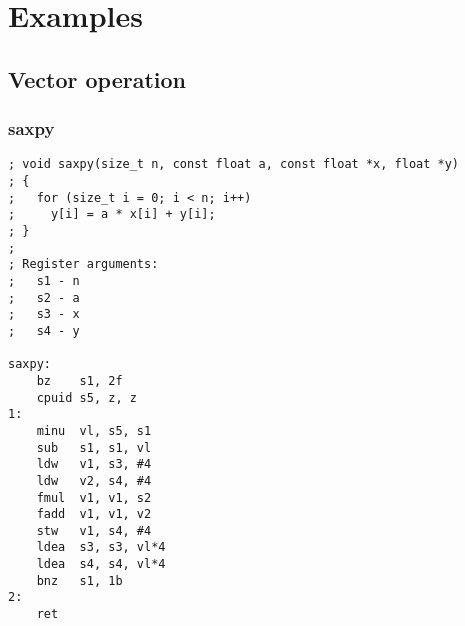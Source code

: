 %

\onecolumn

\chapter{Examples}

\section{Vector operation}

\subsection{saxpy}

\begin{lstlisting}[style=assembler]
; void saxpy(size_t n, const float a, const float *x, float *y)
; {
;   for (size_t i = 0; i < n; i++)
;     y[i] = a * x[i] + y[i];
; }
;
; Register arguments:
;   s1 - n
;   s2 - a
;   s3 - x
;   s4 - y

saxpy:
    bz    s1, 2f
    cpuid s5, z, z
1:
    minu  vl, s5, s1
    sub   s1, s1, vl
    ldw   v1, s3, #4
    ldw   v2, s4, #4
    fmul  v1, v1, s2
    fadd  v1, v1, v2
    stw   v1, s4, #4
    ldea  s3, s3, vl*4
    ldea  s4, s4, vl*4
    bnz   s1, 1b
2:
    ret
\end{lstlisting}

\twocolumn
